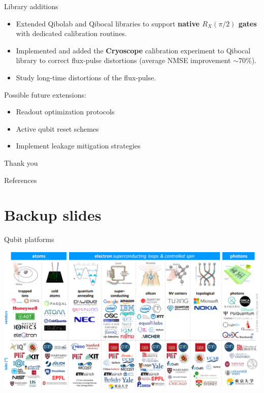 \documentclass[aspectratio=169,10pt]{beamer}
\newcounter{mainframenumber}
\newcommand{\backupbegin}{
  \setcounter{mainframenumber}{\value{framenumber}}
}
\begin{document}
\begin{frame}{Library additions}
  \begin{itemize}
    \item[\ding{51}] Extended Qibolab and Qibocal libraries to support \textbf{native $R_X(\pi/2)$ gates} with dedicated calibration routines.
    \item[\ding{51}] Implemented and added the \textbf{Cryoscope} calibration experiment to Qibocal library to correct flux-pulse distortions (average NMSE improvement $\sim 70\%$).
    \item[\ding{55}] Study long-time distortions of the flux-pulse.
  \end{itemize}
  Possible future extensions: 
  \begin{itemize}[label={\raisebox{0.2ex}{\tiny$\bullet$}}]
    \item Readout optimization protocols
    \item Active qubit reset schemes
    \item Implement leakage mitigation strategies
  \end{itemize}
\end{frame}

\begin{frame}[t,standout]
\Large
Thank you
\end{frame}


\backupbegin
\appendix

\begin{frame}{References}
    \printbibliography
\end{frame}


\section*{Backup slides}

\begin{frame}{Qubit platforms}
  \begin{center}
      \includegraphics[height=0.82\textheight]{figures/platforms.png}
  \end{center}
\end{frame}
\end{document}
